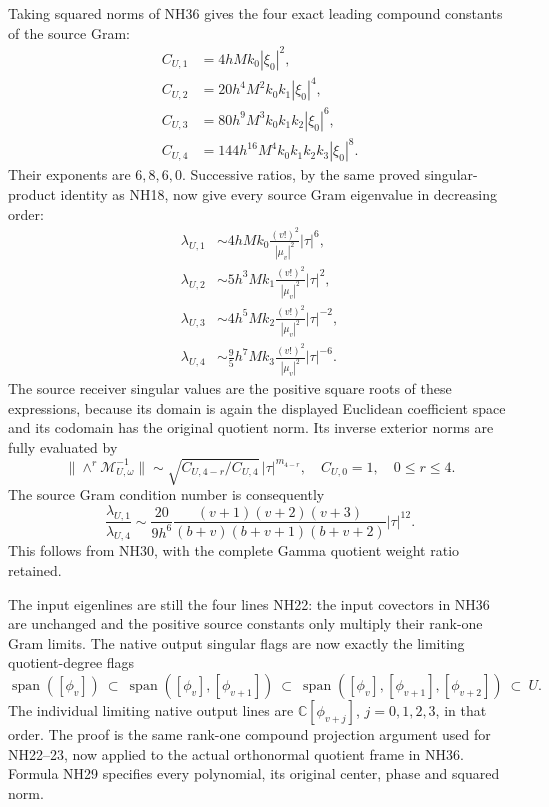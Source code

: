 \documentclass[11pt]{article}
\newcommand{\C}{\mathbb C}
\begin{document}
Taking squared norms of NH36 gives the four exact leading
compound constants of the source Gram:
\[
\begin{aligned}
 C_{U,1}&=4hMk_0|\xi_0|^2,\\
 C_{U,2}&=20h^4M^2k_0k_1|\xi_0|^4,\\
 C_{U,3}&=80h^9M^3k_0k_1k_2|\xi_0|^6,\\
 C_{U,4}&=144h^{16}M^4k_0k_1k_2k_3|\xi_0|^8.
\end{aligned}\tag{NH37}
\]
Their exponents are $6,8,6,0$. Successive ratios, by the
same proved singular-product identity as NH18, now give
every source Gram eigenvalue in decreasing order:
\[
\boxed{\begin{aligned}
 \lambda_{U,1}&\sim4hMk_0\frac{(v!)^2}{|\mu_v|^2}|\tau|^6,\\
 \lambda_{U,2}&\sim5h^3Mk_1\frac{(v!)^2}{|\mu_v|^2}|\tau|^2,\\
 \lambda_{U,3}&\sim4h^5Mk_2\frac{(v!)^2}{|\mu_v|^2}|\tau|^{-2},\\
 \lambda_{U,4}&\sim\tfrac95h^7Mk_3\frac{(v!)^2}{|\mu_v|^2}|\tau|^{-6}.
\end{aligned}}\tag{NH38}
\]
The source receiver singular values are the positive square
roots of these expressions, because its domain is again
the displayed Euclidean coefficient space and its codomain
has the original quotient norm. Its inverse exterior norms
are fully evaluated by
\[
 \|\wedge^r\mathcal M_{U,\omega}^{-1}\|
 \sim\sqrt{C_{U,4-r}/C_{U,4}}\,
                         |\tau|^{m_{4-r}},
 \quad C_{U,0}=1,\quad 0\le r\le4.
 \tag{NH39}
\]
The source Gram condition number is consequently
\[
 \frac{\lambda_{U,1}}{\lambda_{U,4}}
 \sim\frac{20}{9h^6}
 \frac{(v+1)(v+2)(v+3)}{(b+v)(b+v+1)(b+v+2)}|\tau|^{12}.
 \tag{NH40}
\]
This follows from NH30, with the complete Gamma quotient
weight ratio retained.

The input eigenlines are still the four lines NH22: the
input covectors in NH36 are unchanged and the positive
source constants only multiply their rank-one Gram
limits. The native output singular flags are now exactly
the limiting quotient-degree flags
\[
 \operatorname{span}([\phi_v])\ \subset\
 \operatorname{span}([\phi_v],[\phi_{v+1}])\ \subset\
 \operatorname{span}([\phi_v],[\phi_{v+1}],[\phi_{v+2}])
 \ \subset\ U.
 \tag{NH41}
\]
The individual limiting native output lines are
$\C[\phi_{v+j}]$, $j=0,1,2,3$, in that order. The proof
is the same rank-one compound projection argument used
for NH22--23, now applied to the actual orthonormal
quotient frame in NH36. Formula NH29 specifies every
polynomial, its original center, phase and squared norm.
\end{document}

